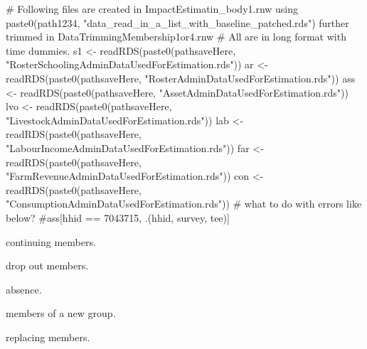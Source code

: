 \begin{Schunk}
\begin{Sinput}
# Following files are created in ImpactEstimatin_body1.rnw using paste0(path1234, "data_read_in_a_list_with_baseline_patched.rds") further trimmed in DataTrimmingMembership1or4.rnw
# All are in long format with time dummies.
s1 <- readRDS(paste0(pathsaveHere, "RosterSchoolingAdminDataUsedForEstimation.rds"))
ar <- readRDS(paste0(pathsaveHere, "RosterAdminDataUsedForEstimation.rds"))
ass <- readRDS(paste0(pathsaveHere, "AssetAdminDataUsedForEstimation.rds"))
lvo <- readRDS(paste0(pathsaveHere, "LivestockAdminDataUsedForEstimation.rds"))
lab <- readRDS(paste0(pathsaveHere, "LabourIncomeAdminDataUsedForEstimation.rds"))
far <- readRDS(paste0(pathsaveHere, "FarmRevenueAdminDataUsedForEstimation.rds"))
con <- readRDS(paste0(pathsaveHere, "ConsumptionAdminDataUsedForEstimation.rds"))
# what to do with errors like below?
#ass[hhid == 7043715, .(hhid, survey, tee)]
\end{Sinput}
\end{Schunk}
\begin{description}
\vspace{1.0ex}\setlength{\itemsep}{1.0ex}\setlength{\baselineskip}{12pt}
\item[c]	continuing members.
\item[d]	drop out members.
\item[a]	absence.
\item[n]	members of a new group.
\item[r]	replacing members.
\end{description}
